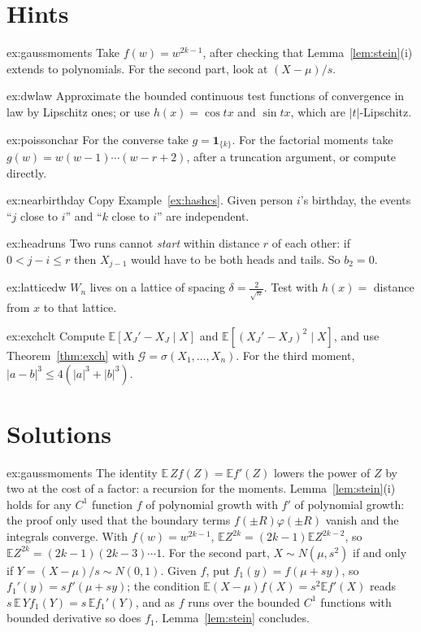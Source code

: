\section{Hints}

\begin{hint}{ex:gaussmoments}
Take $f(w)=w^{2k-1}$, after checking that Lemma~\ref{lem:stein}(i) extends to polynomials. For the second part, look at $(X-\mu)/s$.
\end{hint}
\begin{hint}{ex:dwlaw}
Approximate the bounded continuous test functions of convergence in law by Lipschitz ones; or use $h(x)=\cos tx$ and $\sin tx$, which are $|t|$-Lipschitz.
\end{hint}
\begin{hint}{ex:poissonchar}
For the converse take $g=\mathbf 1_{\{k\}}$. For the factorial moments take $g(w)=w(w-1)\cdots(w-r+2)$, after a truncation argument, or compute directly.
\end{hint}
\begin{hint}{ex:nearbirthday}
Copy Example~\ref{ex:hashcs}. Given person $i$'s birthday, the events ``$j$ close to $i$'' and ``$k$ close to $i$'' are independent.
\end{hint}
\begin{hint}{ex:headruns}
Two runs cannot \emph{start} within distance $r$ of each other: if $0<j-i\le r$ then $X_{j-1}$ would have to be both heads and tails. So $b_2=0$.
\end{hint}
\begin{hint}{ex:latticedw}
$W_n$ lives on a lattice of spacing $\delta=\frac2{\sqrt n}$. Test with $h(x)=$ distance from $x$ to that lattice.
\end{hint}
\begin{hint}{ex:exchclt}
Compute $\mathbb E[X_J'-X_J\mid X]$ and $\mathbb E[(X_J'-X_J)^2\mid X]$, and use Theorem~\ref{thm:exch} with $\mathcal G=\sigma(X_1,\dots,X_n)$. For the third moment, $|a-b|^3\le4(|a|^3+|b|^3)$.
\end{hint}

\section{Solutions}

\begin{solution}{ex:gaussmoments}
\idea The identity $\mathbb E\,Zf(Z)=\mathbb Ef'(Z)$ lowers the power of $Z$ by two at the cost of a factor: a recursion for the moments.
\writeup Lemma~\ref{lem:stein}(i) holds for any $C^1$ function $f$ of polynomial growth with $f'$ of polynomial growth: the proof only used that the boundary terms
$f(\pm R)\varphi(\pm R)$ vanish and the integrals converge. With $f(w)=w^{2k-1}$, $\mathbb EZ^{2k}=(2k-1)\mathbb EZ^{2k-2}$, so $\mathbb EZ^{2k}=(2k-1)(2k-3)\cdots1$.
For the second part, $X\sim N(\mu,s^2)$ if and only if $Y=(X-\mu)/s\sim N(0,1)$. Given $f$, put $f_1(y)=f(\mu+sy)$, so $f_1'(y)=sf'(\mu+sy)$; the condition
$\mathbb E(X-\mu)f(X)=s^2\mathbb Ef'(X)$ reads $s\,\mathbb E\,Yf_1(Y)=s\,\mathbb Ef_1'(Y)$, and as $f$ runs over the bounded $C^1$ functions with bounded derivative so does $f_1$.
Lemma~\ref{lem:stein} concludes.
\end{solution}


